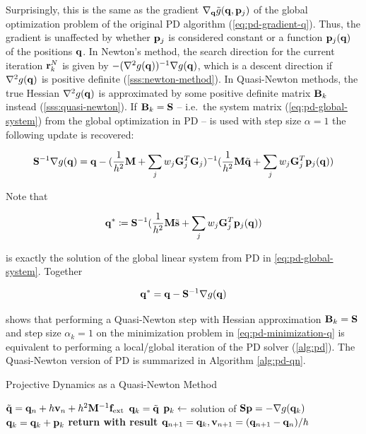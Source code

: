 Surprisingly, this is the same as the gradient $\nabla_{\mathbf{q}} \tilde{g}(\mathbf{q}, \mathbf{p}_j)$ of the global optimization problem of the original
PD algorithm (\cref{eq:pd-gradient-q}). Thus, the gradient is unaffected by whether $\mathbf{p}_j$ is considered constant or a function
$\mathbf{p}_j(\mathbf{q})$ of the positions $\mathbf{q}$. In Newton's method, the search direction for the current iteration $\mathbf{r}^N_k$ is given
by $-(\nabla^2 g(\mathbf{q}))^{-1} \nabla g(\mathbf{q})$, which is a descent direction if $\nabla^2 g(\mathbf{q})$ is positive definite 
(\cref{sss:newton-method}). In Quasi-Newton methods, the true Hessian $\nabla^2 g(\mathbf{q})$ is approximated by some positive definite matrix $\mathbf{B}_k$ 
instead (\cref{sss:quasi-newton}). If $\mathbf{B}_k = \mathbf{S}$ -- i.e.\ the system matrix 
(\cref{eq:pd-global-system}) from the global optimization in PD -- is used with step size $\alpha = 1$ the following update is recovered:

\[
    \mathbf{S}^{-1} \nabla g(\mathbf{q}) = 
    \mathbf{q} - (\frac{1}{h^2}\mathbf{M} + \sum_j w_j \mathbf{G}_j^T \mathbf{G}_j)^{-1} 
    (\frac{1}{h^2}\mathbf{M}\tilde{\mathbf{q}} + \sum_j w_j \mathbf{G}_j^T \mathbf{p}_j(\mathbf{q}))
\]

\noindent Note that 

\[
    \mathbf{q}^* \coloneqq \mathbf{S}^{-1} (\frac{1}{h^2}\mathbf{M}\tilde{\mathbf{s}} + \sum_j w_j 
    \mathbf{G}_j^T \mathbf{p}_j(\mathbf{q}))
\]

\noindent is exactly the solution of the global linear system from PD in \autoref{eq:pd-global-system}. Together

\[
    \mathbf{q}^* = \mathbf{q} -\mathbf{S}^{-1} \nabla g(\mathbf{q}) 
\]

\noindent shows that performing a Quasi-Newton step with Hessian approximation $\mathbf{B}_k = \mathbf{S}$ and step size 
$\alpha_k = 1$ on the 
minimization problem in \autoref{eq:pd-minimization-q} is equivalent to performing a local/global iteration of the PD solver 
(\cref{alg:pd}). The Quasi-Newton version of PD is summarized in Algorithm \ref{alg:pd-qn}.

\begin{algorithm}
\caption{Projective Dynamics as a Quasi-Newton Method}\label{alg:pd-qn}
\begin{algorithmic}
\State $\tilde{\mathbf{q}} = \mathbf{q}_n + h\mathbf{v}_n + h^2\mathbf{M}^{-1}\mathbf{f}_{\text{ext}}$
\State $\mathbf{q}_k = \tilde{\mathbf{q}}$
\State $\mathbf{p}_k \gets$ solution of $\mathbf{S}\mathbf{p} = -\nabla g(\mathbf{q}_k)$
\State $\mathbf{q}_k = \mathbf{q}_k + \mathbf{p}_k$
\EndFor
\State \textbf{return with result } $\mathbf{q}_{n+1} = \mathbf{q}_k, \mathbf{v}_{n+1} = (\mathbf{q}_{n+1} - \mathbf{q}_n)/h$
\EndProcedure
\end{algorithmic}
\end{algorithm}


